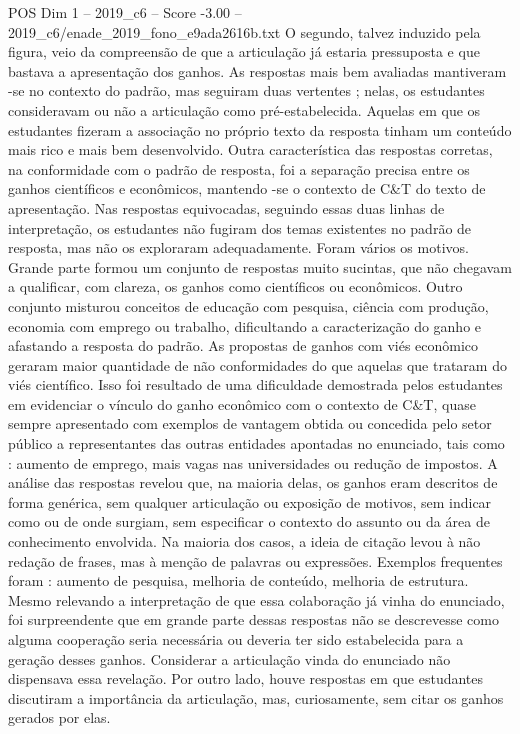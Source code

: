 \begin{textsample}{POS Dim 1 – 2019\_c6 – Score -3.00 – 2019\_c6/enade\_2019\_fono\_e9ada2616b.txt}
O segundo, talvez induzido pela figura, veio da compreensão de que a articulação já estaria pressuposta e que bastava a apresentação dos ganhos.
As respostas mais bem avaliadas mantiveram -se no contexto do padrão, mas seguiram duas vertentes ; nelas, os estudantes consideravam ou não a articulação como pré-estabelecida.
Aquelas em que os estudantes fizeram a associação no próprio texto da resposta tinham um conteúdo mais rico e mais bem desenvolvido.
Outra característica das respostas corretas, na conformidade com o padrão de resposta, foi a separação precisa entre os ganhos científicos e econômicos, mantendo -se o contexto de C\&T do texto de apresentação.
Nas respostas equivocadas, seguindo essas duas linhas de interpretação, os estudantes não fugiram dos temas existentes no padrão de resposta, mas não os exploraram adequadamente.
Foram vários os motivos.
Grande parte formou um conjunto de respostas muito sucintas, que não chegavam a qualificar, com clareza, os ganhos como científicos ou econômicos.
Outro conjunto misturou conceitos de educação com pesquisa, ciência com produção, economia com emprego ou trabalho, dificultando a caracterização do ganho e afastando a resposta do padrão.
As propostas de ganhos com viés econômico geraram maior quantidade de não conformidades do que aquelas que trataram do viés científico.
Isso foi resultado de uma dificuldade demostrada pelos estudantes em evidenciar o vínculo do ganho econômico com o contexto de C\&T, quase sempre apresentado com exemplos de vantagem obtida ou concedida pelo setor público a representantes das outras entidades apontadas no enunciado, tais como : aumento de emprego, mais vagas nas universidades ou redução de impostos.
A análise das respostas revelou que, na maioria delas, os ganhos eram descritos de forma genérica, sem qualquer articulação ou exposição de motivos, sem indicar como ou de onde surgiam, sem especificar o contexto do assunto ou da área de conhecimento envolvida.
Na maioria dos casos, a ideia de citação levou à não redação de frases, mas à menção de palavras ou expressões.
Exemplos frequentes foram : aumento de pesquisa, melhoria de conteúdo, melhoria de estrutura.
Mesmo relevando a interpretação de que essa colaboração já vinha do enunciado, foi surpreendente que em grande parte dessas respostas não se descrevesse como alguma cooperação seria necessária ou deveria ter sido estabelecida para a geração desses ganhos.
Considerar a articulação vinda do enunciado não dispensava essa revelação.
Por outro lado, houve respostas em que estudantes discutiram a importância da articulação, mas, curiosamente, sem citar os ganhos gerados por elas.

\end{textsample}
